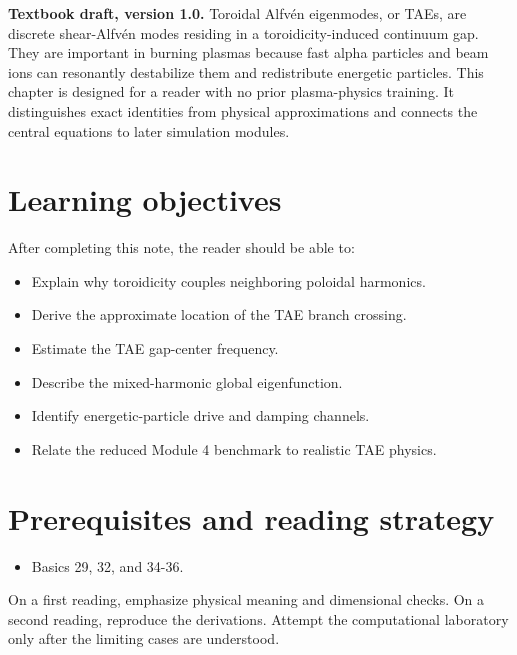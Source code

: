 \documentclass[11pt]{article}
\begin{document}

\begin{overviewbox}
\textbf{Textbook draft, version 1.0.} Toroidal Alfvén eigenmodes, or TAEs, are discrete shear-Alfvén modes residing in a toroidicity-induced continuum gap. They are important in burning plasmas because fast alpha particles and beam ions can resonantly destabilize them and redistribute energetic particles. This chapter is designed for a reader with no prior plasma-physics training. It distinguishes exact identities from physical approximations and connects the central equations to later simulation modules.
\end{overviewbox}

\ProjectTOC

\section{Learning objectives}
After completing this note, the reader should be able to:
\begin{itemize}[leftmargin=1.6em]
\item Explain why toroidicity couples neighboring poloidal harmonics.
\item Derive the approximate location of the TAE branch crossing.
\item Estimate the TAE gap-center frequency.
\item Describe the mixed-harmonic global eigenfunction.
\item Identify energetic-particle drive and damping channels.
\item Relate the reduced Module 4 benchmark to realistic TAE physics.
\end{itemize}

\section{Prerequisites and reading strategy}
\begin{itemize}[leftmargin=1.6em]
\item Basics 29, 32, and 34-36.
\end{itemize}
On a first reading, emphasize physical meaning and dimensional checks. On a second reading, reproduce the derivations. Attempt the computational laboratory only after the limiting cases are understood.
\end{document}
